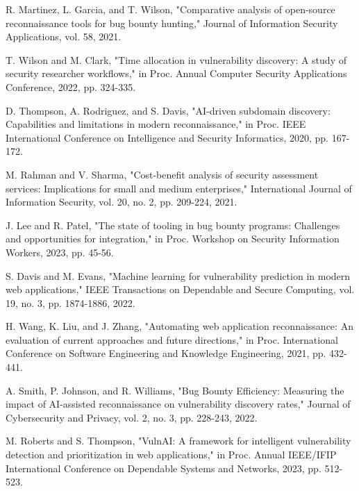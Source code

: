 \documentclass[conference]{IEEEtran}
\begin{document}
\begin{thebibliography}{00}
 R. Martinez, L. Garcia, and T. Wilson, "Comparative analysis of open-source reconnaissance tools for bug bounty hunting," Journal of Information Security Applications, vol. 58, 2021.

 T. Wilson and M. Clark, "Time allocation in vulnerability discovery: A study of security researcher workflows," in Proc. Annual Computer Security Applications Conference, 2022, pp. 324-335.

 D. Thompson, A. Rodriguez, and S. Davis, "AI-driven subdomain discovery: Capabilities and limitations in modern reconnaissance," in Proc. IEEE International Conference on Intelligence and Security Informatics, 2020, pp. 167-172.

 M. Rahman and V. Sharma, "Cost-benefit analysis of security assessment services: Implications for small and medium enterprises," International Journal of Information Security, vol. 20, no. 2, pp. 209-224, 2021.

 J. Lee and R. Patel, "The state of tooling in bug bounty programs: Challenges and opportunities for integration," in Proc. Workshop on Security Information Workers, 2023, pp. 45-56.

 S. Davis and M. Evans, "Machine learning for vulnerability prediction in modern web applications," IEEE Transactions on Dependable and Secure Computing, vol. 19, no. 3, pp. 1874-1886, 2022.

 H. Wang, K. Liu, and J. Zhang, "Automating web application reconnaissance: An evaluation of current approaches and future directions," in Proc. International Conference on Software Engineering and Knowledge Engineering, 2021, pp. 432-441.

 A. Smith, P. Johnson, and R. Williams, "Bug Bounty Efficiency: Measuring the impact of AI-assisted reconnaissance on vulnerability discovery rates," Journal of Cybersecurity and Privacy, vol. 2, no. 3, pp. 228-243, 2022.

 M. Roberts and S. Thompson, "VulnAI: A framework for intelligent vulnerability detection and prioritization in web applications," in Proc. Annual IEEE/IFIP International Conference on Dependable Systems and Networks, 2023, pp. 512-523.
\end{thebibliography}
\end{document}
